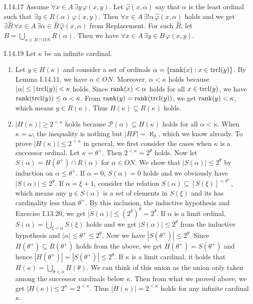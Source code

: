 \documentclass[12pt]{article}
\begin{document}
\begin{customthm}{I.14.17}
  Assume $\forall x\in A\,\exists y\,\varphi(x,y)$. Let $\hat\varphi(x,\alpha)$ say that $\alpha$ is the least ordinal such that $\exists y\in R(\alpha)\,\varphi(x,y)$. Then $\forall x\in A\,\exists!\alpha\,\hat\varphi(x,\alpha)$ holds and we get $\exists\hat B\,\forall x\in A\,\exists\alpha\in\hat B\,\hat\varphi(x,\alpha)$ from Replacement. For such $\hat B$, let $B=\bigcup_{\alpha\in B\cap ON}R(\alpha)$. Then we have $\forall x\in A\,\exists y\in B\,\varphi(x,y)$.
\end{customthm}

\begin{customthm}{I.14.19}
  Let $\kappa$ be an infinite cardinal.
  \begin{enumerate}
    \item Let $y\in H(\kappa)$ and consider a set of ordinals $\alpha=\{\mathop{\mathrm{rank}}(x):x\in \mathop{\mathrm{trcl}}(y)\}$. By Lemma I.14.11, we have $\alpha\in ON$. Moreover, $\alpha<\kappa$ holds because $|\alpha|\leq|\mathop{\mathrm{trcl}}(y)|<\kappa$ holds. Since $\mathop{\mathrm{rank}}(x)<\alpha$ holds for all $x\in\mathop{\mathrm{trcl}}(y)$, we have $\mathop{\mathrm{rank}}(\mathop{\mathrm{trcl}}(y))\leq\alpha<\kappa$. From $\mathop{\mathrm{rank}}(y)=\mathop{\mathrm{rank}}(\mathop{\mathrm{trcl}}(y))$, we get $\mathop{\mathrm{rank}}(y)<\kappa$, which means $y\in R(\kappa)$. Thus $H(\kappa)\subseteq R(\kappa)$ holds.
    \item $|H(\kappa)|\geq2^{<\kappa}$ holds because $\mathcal{P}(\alpha)\subseteq H(\kappa)$ holds for all $\alpha<\kappa$. When $\kappa=\omega$, the inequality is nothing but $|HF|=\aleph_0$, which we know already. To prove $|H(\kappa)|\leq2^{<\kappa}$ in general, we first consider the cases when $\kappa$ is a successor ordinal. Let $\kappa=\theta^+$. Then $2^{<\kappa}=2^\theta$ holds. Now let $S(\alpha)=H(\theta^+)\cap R(\alpha)$ for $\alpha\in ON$. We show that $|S(\alpha)|\leq2^\theta$ by induction on $\alpha\leq\theta^+$. If $\alpha=0$, $S(\alpha)=0$ holds and we obviously have $|S(\alpha)|\leq2^\theta$. If $\alpha=\xi+1$, consider the relation $S(\alpha)\subseteq[S(\xi)]^{<\theta^+}$, which means any $y\in S(\alpha)$ is a set of elements in $S(\xi)$ and its has cardinality less than $\theta^+$. By this inclusion, the inductive hypothesis and Exercise I.13.20, we get $|S(\alpha)|\leq(2^\theta)^\theta=2^\theta$. If $\alpha$ is a limit ordinal, $S(\alpha)=\bigcup_{\xi<\alpha}S(\xi)$ holds and we get $|S(\alpha)|\leq2^\theta$ from the inductive hypothesis and $|\alpha|\leq\theta^+\leq2^\theta$. Now we have $|S(\theta^+)|\leq2^\theta$. Since $H(\theta^+)\subseteq R(\theta^+)$ holds from the above, we get $H(\theta^+)=S(\theta^+)$ and hence $|H(\theta^+)|=|S(\theta^+)|\leq2^\theta$. If $\kappa$ is a limit cardinal, it holds that $H(\kappa)=\bigcup_{\theta<\kappa}H(\theta)$. We can think of this union as the union only taken among the successor cardinals below $\kappa$. Then from what we proved above, we get $|H(\kappa)|\leq2^\kappa=2^{<\kappa}$. Thus $|H(\kappa)|=2^{<\kappa}$ holds for any infinite cardinal $\kappa$.
    \end{enumerate}
\end{customthm}
\end{document}
